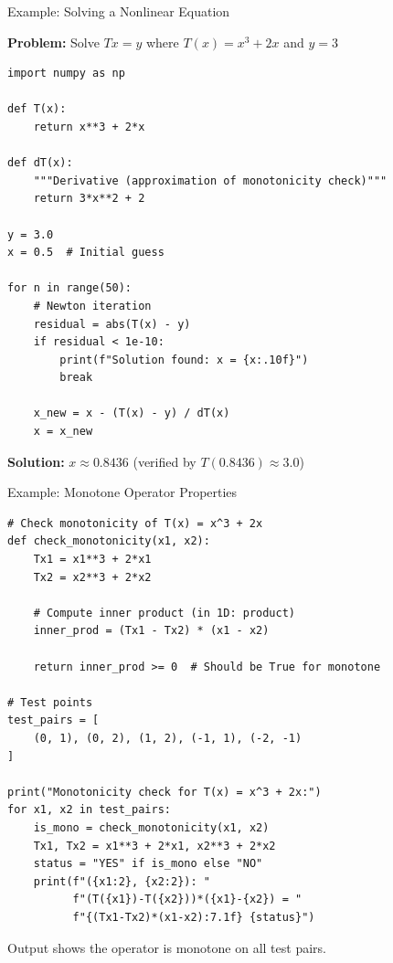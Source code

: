 \documentclass[aspectratio=169,10pt]{beamer}
\begin{document}
\begin{frame}[fragile]{Example: Solving a Nonlinear Equation}

\textbf{Problem:} Solve $Tx = y$ where $T(x) = x^3 + 2x$ and $y = 3$

\begin{lstlisting}
import numpy as np

def T(x):
    return x**3 + 2*x

def dT(x):
    """Derivative (approximation of monotonicity check)"""
    return 3*x**2 + 2

y = 3.0
x = 0.5  # Initial guess

for n in range(50):
    # Newton iteration
    residual = abs(T(x) - y)
    if residual < 1e-10:
        print(f"Solution found: x = {x:.10f}")
        break

    x_new = x - (T(x) - y) / dT(x)
    x = x_new
\end{lstlisting}

\textbf{Solution:} $x \approx 0.8436$ (verified by $T(0.8436) \approx 3.0$)

\end{frame}

\begin{frame}[fragile]{Example: Monotone Operator Properties}

\begin{lstlisting}
# Check monotonicity of T(x) = x^3 + 2x
def check_monotonicity(x1, x2):
    Tx1 = x1**3 + 2*x1
    Tx2 = x2**3 + 2*x2

    # Compute inner product (in 1D: product)
    inner_prod = (Tx1 - Tx2) * (x1 - x2)

    return inner_prod >= 0  # Should be True for monotone

# Test points
test_pairs = [
    (0, 1), (0, 2), (1, 2), (-1, 1), (-2, -1)
]

print("Monotonicity check for T(x) = x^3 + 2x:")
for x1, x2 in test_pairs:
    is_mono = check_monotonicity(x1, x2)
    Tx1, Tx2 = x1**3 + 2*x1, x2**3 + 2*x2
    status = "YES" if is_mono else "NO"
    print(f"({x1:2}, {x2:2}): "
          f"(T({x1})-T({x2}))*({x1}-{x2}) = "
          f"{(Tx1-Tx2)*(x1-x2):7.1f} {status}")
\end{lstlisting}

Output shows the operator is monotone on all test pairs.

\end{frame}

\end{document}
